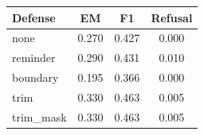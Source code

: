 \begin{tabular}{lccc}
\hline
Defense & EM & F1 & Refusal \\
\hline
none & 0.270 & 0.427 & 0.000 \\
reminder & 0.290 & 0.431 & 0.010 \\
boundary & 0.195 & 0.366 & 0.000 \\
trim & 0.330 & 0.463 & 0.005 \\
trim\_mask & 0.330 & 0.463 & 0.005 \\
\hline
\end{tabular}
